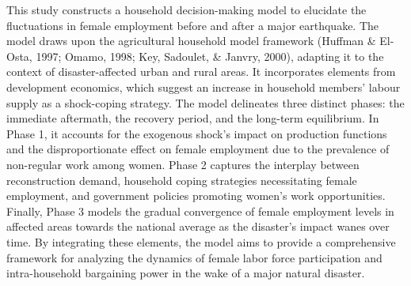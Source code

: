 \documentclass[12pt,halfline,a4paper]{ouparticle}
\begin{document}
This study constructs a household decision-making model to elucidate the fluctuations in female employment before and after a major earthquake. The model draws upon the agricultural household model framework (Huffman \& El-Osta, 1997; Omamo, 1998; Key, Sadoulet, \& Janvry, 2000), adapting it to the context of disaster-affected urban and rural areas. It incorporates elements from development economics, which suggest an increase in household members' labour supply as a shock-coping strategy.
The model delineates three distinct phases: the immediate aftermath, the recovery period, and the long-term equilibrium. In Phase 1, it accounts for the exogenous shock's impact on production functions and the disproportionate effect on female employment due to the prevalence of non-regular work among women. Phase 2 captures the interplay between reconstruction demand, household coping strategies necessitating female employment, and government policies promoting women's work opportunities. Finally, Phase 3 models the gradual convergence of female employment levels in affected areas towards the national average as the disaster's impact wanes over time.
By integrating these elements, the model aims to provide a comprehensive framework for analyzing the dynamics of female labor force participation and intra-household bargaining power in the wake of a major natural disaster.



\nocite{*}

\end{document}
